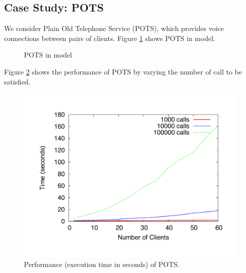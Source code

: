 \subsection{Case Study: POTS}
\label{sec:pots}
We consider Plain Old Telephone Service (POTS), which provides voice connections between pairs of clients. Figure \ref{fig:pots} shows POTS in {\compmodel} model. 

\begin{figure} \centering
        \scalebox{0.5}{}
        \caption{POTS in {\compmodel} model}\label{fig:pots}
\end{figure}

Figure \ref{bench:pots} shows the performance of POTS by varying the number of call to be satisfied.  

\begin{figure} 
\centering
        \includegraphics[scale=0.4]{bench/benchpots.pdf}
            \caption{Performance (execution time in seconds) of POTS.}
\label{bench:pots}
\end{figure}


